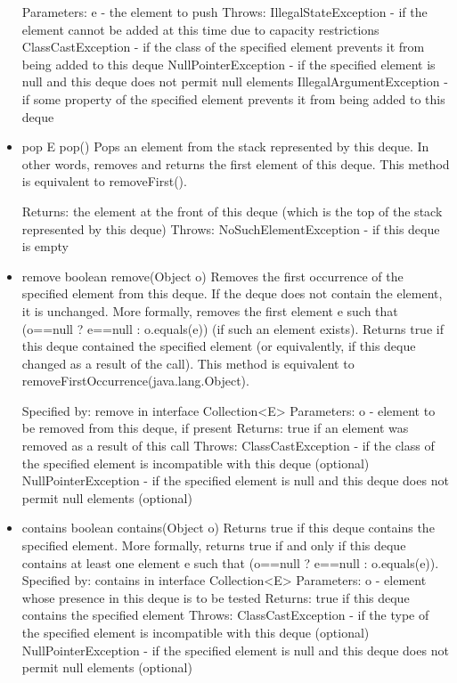 \documentclass{book}
\begin{document}
\begin{itemize}
	Parameters:
	e - the element to push
	Throws:
	IllegalStateException - if the element cannot be added at this time due to capacity restrictions
	ClassCastException - if the class of the specified element prevents it from being added to this deque
	NullPointerException - if the specified element is null and this deque does not permit null elements
	IllegalArgumentException - if some property of the specified element prevents it from being added to this deque
	
	\item pop
	E pop()
	Pops an element from the stack represented by this deque. In other words, removes and returns the first element of this deque.
	This method is equivalent to removeFirst().
	
	Returns:
	the element at the front of this deque (which is the top of the stack represented by this deque)
	Throws:
	NoSuchElementException - if this deque is empty
	
	\item remove
	boolean remove(Object o)
	Removes the first occurrence of the specified element from this deque. If the deque does not contain the element, it is unchanged. More formally, removes the first element e such that (o==null ? e==null : o.equals(e)) (if such an element exists). Returns true if this deque contained the specified element (or equivalently, if this deque changed as a result of the call).
	This method is equivalent to removeFirstOccurrence(java.lang.Object).
	
	Specified by:
	remove in interface Collection<E>
	Parameters:
	o - element to be removed from this deque, if present
	Returns:
	true if an element was removed as a result of this call
	Throws:
	ClassCastException - if the class of the specified element is incompatible with this deque (optional)
	NullPointerException - if the specified element is null and this deque does not permit null elements (optional)
	
	\item contains
	boolean contains(Object o)
	Returns true if this deque contains the specified element. More formally, returns true if and only if this deque contains at least one element e such that (o==null ? e==null : o.equals(e)).
	Specified by:
	contains in interface Collection<E>
	Parameters:
	o - element whose presence in this deque is to be tested
	Returns:
	true if this deque contains the specified element
	Throws:
	ClassCastException - if the type of the specified element is incompatible with this deque (optional)
	NullPointerException - if the specified element is null and this deque does not permit null elements (optional)
	

\end{itemize}
\end{document}
